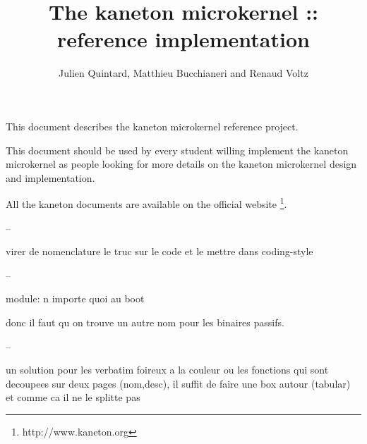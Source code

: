 %
%
%
%
%
%

%
%

\def\path{../..}

%
%



%
%

\rhead{}

%
%

\title{The kaneton microkernel :: reference implementation
       \logos}

%
%

\author{\small{Julien Quintard},
        \small{Matthieu Bucchianeri} and
        \small{Renaud Voltz}}

%
%



%
%

\maketitle

%
%

This document describes the kaneton microkernel reference project.

This document should be used by every student willing implement the
kaneton microkernel as people looking for more details on the kaneton
microkernel design and implementation.

All the kaneton documents are available on
the official website
  \footnote{http://www.kaneton.org}.

%
%

\tableofcontents

%
%















%
%






--

virer de nomenclature le truc sur le code et le mettre dans coding-style

--

module: n importe quoi au boot

donc il faut qu on trouve un autre nom pour les binaires passifs.

--

un solution pour les verbatim foireux a la couleur ou les fonctions
qui sont decoupees sur deux pages (nom,desc), il suffit de faire une
box autour (tabular) et comme ca il ne le splitte pas
